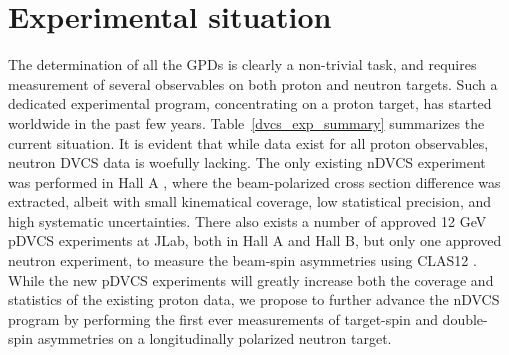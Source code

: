 \section{Experimental situation}\label{sec_exp_situation}
The determination of all the GPDs is clearly a non-trivial task, and requires measurement of several observables on both proton and neutron targets. 
Such a dedicated experimental program, concentrating on a proton target, has started worldwide in the past few years. 
Table~\ref{dvcs_exp_summary} summarizes the current situation.  It is evident that while data exist for all proton observables, neutron DVCS data is woefully lacking.  The only existing nDVCS experiment was performed in Hall A \cite{malek}, where the beam-polarized cross section difference was extracted, albeit with small kinematical coverage, low statistical precision, and high systematic uncertainties. There also exists a number of approved 12 GeV pDVCS experiments at JLab, both in Hall A and Hall B, but only one approved neutron experiment, to measure the beam-spin asymmetries using CLAS12 \cite{proposal}.  While the new pDVCS experiments will greatly increase both the coverage and statistics of the existing proton data, we propose to further advance the nDVCS program by performing the first ever measurements of target-spin and double-spin asymmetries on a longitudinally polarized neutron target.

